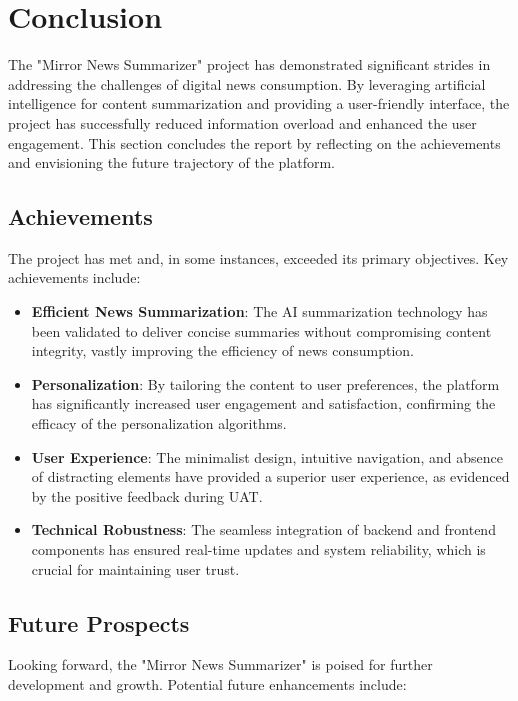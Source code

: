 \documentclass[10pt]{article}
\begin{document}
\newpage

\section{Conclusion}

The "Mirror News Summarizer" project has demonstrated significant strides in addressing the challenges of digital news consumption. By leveraging artificial intelligence for content summarization and providing a user-friendly interface, the project has successfully reduced information overload and enhanced the user engagement. This section concludes the report by reflecting on the achievements and envisioning the future trajectory of the platform.

\subsection{Achievements}

The project has met and, in some instances, exceeded its primary objectives. Key achievements include:

\begin{itemize}
    \item \textbf{Efficient News Summarization}: The AI summarization technology has been validated to deliver concise summaries without compromising content integrity, vastly improving the efficiency of news consumption.
    \item \textbf{Personalization}: By tailoring the content to user preferences, the platform has significantly increased user engagement and satisfaction, confirming the efficacy of the personalization algorithms.
    \item \textbf{User Experience}: The minimalist design, intuitive navigation, and absence of distracting elements have provided a superior user experience, as evidenced by the positive feedback during UAT.
    \item \textbf{Technical Robustness}: The seamless integration of backend and frontend components has ensured real-time updates and system reliability, which is crucial for maintaining user trust.
\end{itemize}

\subsection{Future Prospects}

Looking forward, the "Mirror News Summarizer" is poised for further development and growth. Potential future enhancements include:
\end{document}
